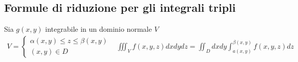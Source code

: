 \documentclass{book}
\begin{document}
\subsection{Formule di riduzione per gli integrali tripli}
Sia $g(x,y)$ integrabile in un dominio normale $V$
\begin{equation*}
  \begin{matrix}
    V=\begin{cases}
        \alpha (x,y) \leq z\leq \beta (x,y)\\
        (x,y)\in D
      \end{cases} & \iiint_V f(x,y,z) dxdydz = \iint_D dxdy \displaystyle\int_{a(x,y)}^{\beta (x,y)} f(x,y,z)dz
  \end{matrix}
\end{equation*}


\printindex
\end{document}
